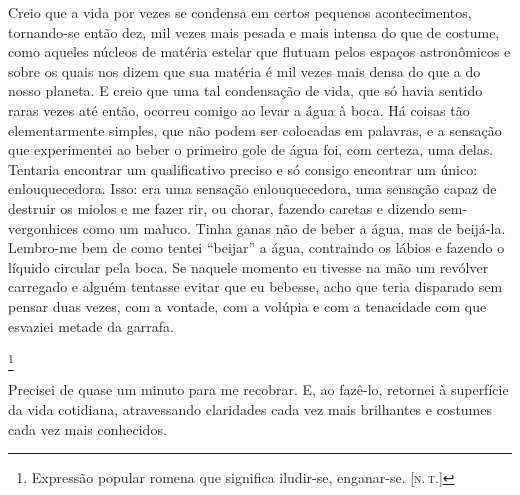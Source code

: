 Creio que a vida por vezes se condensa em certos pequenos
acontecimentos, tornando-se então dez, mil vezes mais pesada e mais
intensa do que de costume, como aqueles núcleos de matéria estelar que
flutuam pelos espaços astronômicos e sobre os quais nos dizem que sua
matéria é mil vezes mais densa do que a do nosso planeta. E creio que
uma tal condensação de vida, que só havia sentido raras vezes até então,
ocorreu comigo ao levar a água à boca. Há coisas tão elementarmente
simples, que não podem ser colocadas em palavras, e a sensação que
experimentei ao beber o primeiro gole de água foi, com certeza, uma
delas. Tentaria encontrar um qualificativo preciso e só consigo
encontrar um único: enlouquecedora. Isso: era uma sensação
enlouquecedora, uma sensação capaz de destruir os miolos e me fazer rir,
ou chorar, fazendo caretas e dizendo sem-vergonhices como um maluco.
Tinha ganas não de beber a água, mas de beijá-la. Lembro-me bem de como
tentei ``beijar'' a água, contraindo os lábios e fazendo o líquido
circular pela boca. Se naquele momento eu tivesse na mão um revólver
carregado e alguém tentasse evitar que eu bebesse, acho que teria
disparado sem pensar duas vezes, com a vontade, com a volúpia e com a
tenacidade com que esvaziei metade da garrafa.

\footnote{Expressão popular romena que significa iludir-se, enganar-se. {[}\textsc{n.\,t.}{]}} 


Precisei de quase um minuto para me recobrar. E, ao fazê-lo, retornei à
superfície da vida cotidiana, atravessando claridades cada vez mais
brilhantes e costumes cada vez mais conhecidos.


